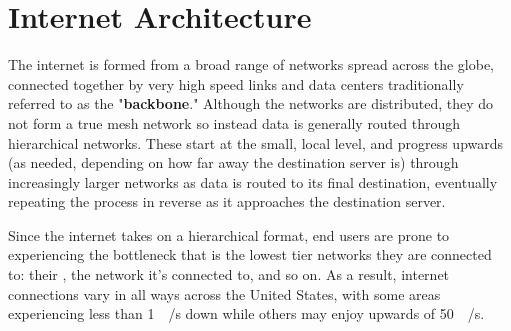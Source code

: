 \section{Internet Architecture}\label{sec:background_internet_architecture}

The internet is formed from a broad range of networks spread across the globe, connected together by very high speed links and data centers traditionally referred to as the "\textbf{\gls{backbone}}." Although the networks are distributed, they do not form a true mesh network so instead data is generally routed through hierarchical networks. These start at the small, local level, and progress upwards (as needed, depending on how far away the destination server is) through increasingly larger networks as data is routed to its final destination, eventually repeating the process in reverse as it approaches the destination server.

Since the internet takes on a hierarchical format, end users are prone to experiencing the bottleneck that is the lowest tier networks they are connected to: their \isp, the network it's connected to, and so on. As a result, internet connections vary in all ways across the United States, with some areas experiencing less than \SI{1}{\mega\bit/\second} down while others may enjoy upwards of \SI{50}{\mega\bit/\second}.